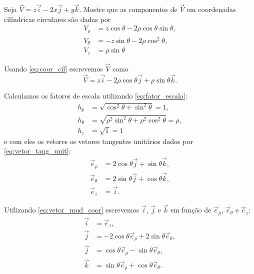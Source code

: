 \documentclass[a4paper,12pt, leqno, answers]{exam}
\begin{document}
\begin{questions}
    \question Seja $\vec{V} = z\vec{i} - 2x\vec{j} + y \vec{k}$. Mostre que as componentes de $\vec{V}$ em coordenadas cil\'{i}ndricas circulares s\~{a}o dadas por
    \begin{align*}
        V_\rho &= z \cos \theta - 2 \rho \cos \theta \sin \theta, \\
        V_\theta &= -z \sin \theta - 2 \rho \cos^2 \theta, \\
        V_z &= \rho \sin \theta
    \end{align*}
    \begin{solution}
        Usando \eqref{eq:coor_cil} escrevemos $\vec{V}$ como
        \[
        \vec{V} = z\vec{i} - 2 \rho \cos \theta \vec{j} + \rho \sin \theta \vec{k}.
        \]
  
        Calculamos os fatores de escala utilizando \eqref{eq:fator_escala}:
        \begin{align*}
            h_p &= \sqrt{\cos^2 \theta + \sin^2 \theta} = 1, \\
            h_\theta &= \sqrt{\rho^2 \sin^2 \theta + \rho^2 \cos^2 \theta} = \rho, \\
            h_z &= \sqrt{1} = 1
        \end{align*}
        e com eles os vetores os vetores tangentes unit\'{a}rios dados por \eqref{eq:vetor_tang_unit}:
        \begin{align*}
            \vec{e}_\rho &= 2 \cos \theta \vec{j} + \sin \theta \vec{k}, \\
            \vec{e}_\theta &= 2 \sin \theta \vec{j} + \cos \theta \vec{k}, \\
            \vec{e}_z &= \vec{i}.
        \end{align*}
  
        Utilizando \eqref{eq:vetor_mud_coor} escrevemos $\vec{i}$, $\vec{j}$ e $\vec{k}$ em fun\c{c}\~{a}o de $\vec{e}_\rho$, $\vec{e}_\theta$ e $\vec{e}_z$:
        \begin{align*}
            \vec{i} &= \vec{e}_z, \\
            \vec{j} &= -2 \cos \theta \vec{e}_\rho + 2 \sin \theta \vec{e}_\theta, \\
            \vec{j} &= \cos \theta \vec{e}_\rho - \sin \theta \vec{e}_\theta, \\
            \vec{k} &= \sin \theta \vec{e}_\rho + \cos \theta \vec{e}_\theta.
        \end{align*}
  

\end{solution}
\end{questions}
\end{document}
